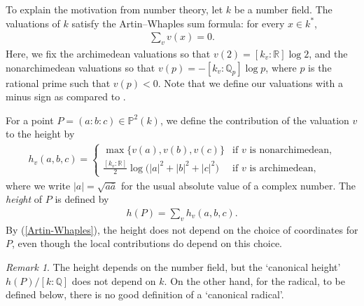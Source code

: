 \documentclass{amsart}
\newcommand\Q{\mathbb{Q}}	\newcommand\R{\mathbb{R}}	\newcommand\C{\mathbb{C}}	\newcommand\bbP{\mathbb{P}}
\theoremstyle{definition}\newtheorem{definition}[theorem]{Definition}
\theoremstyle{remark}\newtheorem{remark}[theorem]{Remark}
\numberwithin{equation}{section}
\begin{document}
To explain the motivation from number theory,
let $k$ be a number field.
The valuations of $k$ satisfy the Artin--Whaples sum formula:
for every $x\in k^*$,
\begin{gather}\label{Artin-Whaples}
\sum_vv(x)=0.
\end{gather}
Here,
 we fix the archimedean valuations so that $v(2)=[k_v:\R]\log2$,
and the nonarchimedean valuations so that $v(p)=-[k_v:\Q_p]\log p$,
where $p$ is the rational prime such that $v(p)<0$.
Note that we define our valuations with a minus sign as compared to \cite{Serre}.

For a point $P=(a:b:c)\in\bbP^2(k)$,
we define the contribution of the valuation $v$ to the height by
\begin{gather*}
h_v(a,b,c)=\begin{cases}
\max\{v(a),v(b),v(c)\}				&\text{if $v$ is nonarchimedean,}\\
\frac{[k_v:\R]}2\log\bigl(|a|^{2}+|b|^{2}+|c|^{2}\bigr)&\text{if $v$ is archimedean},
\end{cases}
\end{gather*}
where we write $|a|=\sqrt{a\bar a}$ for the usual absolute value of a complex number.
The {\em height\/} of $P$ is defined by
\begin{gather*}
h(P)=\sum_vh_v(a,b,c).
\end{gather*}
By (\ref{Artin-Whaples}),
the height does not depend on the choice of coordinates for $P$,
even though the local contributions do depend on this choice.

\begin{remark}
The height depends on the number field,
but the `canonical height' $h(P)/[k:\Q]$ does not depend on $k$.
On the other hand,
for the radical,
to be defined below,
there is no good definition of a `canonical radical'.
\end{remark}
\end{document}
